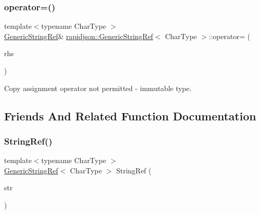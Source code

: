 \subsubsection{\texorpdfstring{operator=()}{operator=()}}
{\footnotesize\ttfamily template$<$typename Char\+Type $>$ \\
\mbox{\hyperlink{structrapidjson_1_1_generic_string_ref}{Generic\+String\+Ref}}\& \mbox{\hyperlink{structrapidjson_1_1_generic_string_ref}{rapidjson\+::\+Generic\+String\+Ref}}$<$ Char\+Type $>$\+::operator= (\begin{DoxyParamCaption}\item[{const \mbox{\hyperlink{structrapidjson_1_1_generic_string_ref}{Generic\+String\+Ref}}$<$ Char\+Type $>$ \&}]{rhs }\end{DoxyParamCaption})\hspace{0.3cm}{\ttfamily [private]}}



Copy assignment operator not permitted -\/ immutable type. 



\subsection{Friends And Related Function Documentation}
\mbox{\label{structrapidjson_1_1_generic_string_ref_aa6b9fd9f6aa49405a574c362ba9af6b5}} 
\subsubsection{\texorpdfstring{StringRef()}{StringRef()}\hspace{0.1cm}{\footnotesize\ttfamily [1/2]}}
{\footnotesize\ttfamily template$<$typename Char\+Type $>$ \\
\mbox{\hyperlink{structrapidjson_1_1_generic_string_ref}{Generic\+String\+Ref}}$<$ Char\+Type $>$ String\+Ref (\begin{DoxyParamCaption}\item[{const Char\+Type $\ast$}]{str }\end{DoxyParamCaption})\hspace{0.3cm}{\ttfamily [related]}}




